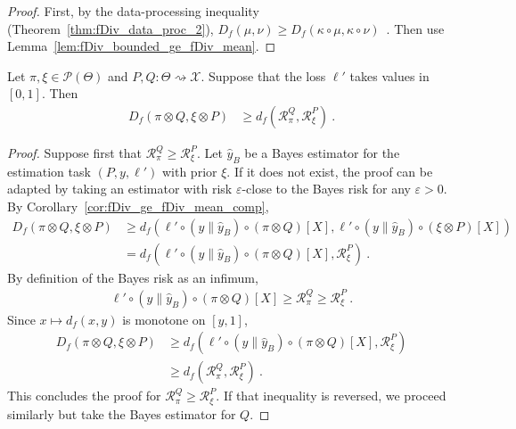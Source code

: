 \begin{proof}%
{}
First, by the data-processing inequality (Theorem~\ref{thm:fDiv_data_proc_2}),
$D_f(\mu, \nu) \ge D_f(\kappa \circ \mu, \kappa \circ \nu)$~.
Then use Lemma~\ref{lem:fDiv_bounded_ge_fDiv_mean}.
\end{proof}


\begin{lemma}
  \label{lem:fDiv_estimation_ge}
  Let $\pi, \xi \in \mathcal P(\Theta)$ and $P, Q : \Theta \rightsquigarrow \mathcal X$. Suppose that the loss $\ell'$ takes values in $[0,1]$. Then
  \begin{align*}
  D_f(\pi \otimes Q, \xi \otimes P)
  &\ge d_f(\mathcal R_\pi^Q, \mathcal R_\xi^P)
  \: .
  \end{align*}
\end{lemma}

\begin{proof}%
{}
Suppose first that $\mathcal R_\pi^Q \ge \mathcal R_\xi^P$.
Let $\hat{y}_B$ be a Bayes estimator for the estimation task $(P, y, \ell')$ with prior $\xi$. If it does not exist, the proof can be adapted by taking an estimator with risk $\varepsilon$-close to the Bayes risk for any $\varepsilon > 0$.
By Corollary~\ref{cor:fDiv_ge_fDiv_mean_comp},
\begin{align*}
D_f(\pi \otimes Q, \xi \otimes P)
&\ge d_f(\ell' \circ (y \parallel \hat{y}_B) \circ (\pi \otimes Q) [X], \ell' \circ (y \parallel \hat{y}_B) \circ (\xi \otimes P) [X])
\\
&= d_f(\ell' \circ (y \parallel \hat{y}_B) \circ (\pi \otimes Q) [X], \mathcal R_\xi^P)
\: .
\end{align*}
By definition of the Bayes risk as an infimum,
\begin{align*}
\ell' \circ (y \parallel \hat{y}_B) \circ (\pi \otimes Q) [X]
\ge \mathcal R_\pi^Q
\ge \mathcal R_\xi^P
\: .
\end{align*}
Since $x \mapsto d_f(x, y)$ is monotone on $[y, 1]$,
\begin{align*}
D_f(\pi \otimes Q, \xi \otimes P)
&\ge d_f(\ell' \circ (y \parallel \hat{y}_B) \circ (\pi \otimes Q) [X], \mathcal R_\xi^P)
\\
&\ge d_f(\mathcal R_\pi^Q, \mathcal R_\xi^P)
\: .
\end{align*}
This concludes the proof for $\mathcal R_\pi^Q \ge \mathcal R_\xi^P$. If that inequality is reversed, we proceed similarly but take the Bayes estimator for $Q$.
\end{proof}





